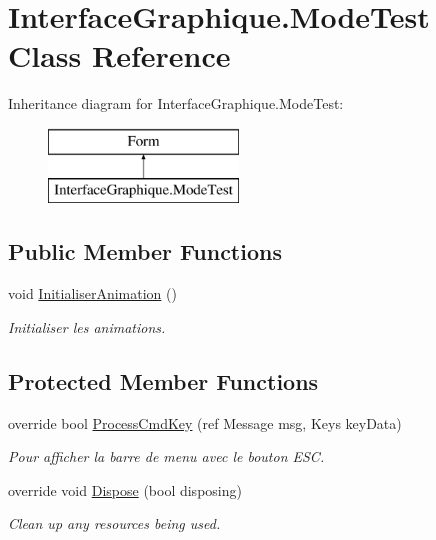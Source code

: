 \hypertarget{class_interface_graphique_1_1_mode_test}{}\section{Interface\+Graphique.\+Mode\+Test Class Reference}
\label{class_interface_graphique_1_1_mode_test}
Inheritance diagram for Interface\+Graphique.\+Mode\+Test\+:\begin{figure}[H]
\begin{center}
\leavevmode
\includegraphics[height=2.000000cm]{class_interface_graphique_1_1_mode_test}
\end{center}
\end{figure}
\subsection*{Public Member Functions}
\begin{DoxyCompactItemize}
\item 
\hypertarget{class_interface_graphique_1_1_mode_test_afb82898571c13159717496bd5ef0f9cd}{}\label{class_interface_graphique_1_1_mode_test_afb82898571c13159717496bd5ef0f9cd} 
void \hyperlink{class_interface_graphique_1_1_mode_test_afb82898571c13159717496bd5ef0f9cd}{Initialiser\+Animation} ()
\begin{DoxyCompactList}\small\item\em Initialiser les animations. \end{DoxyCompactList}\end{DoxyCompactItemize}
\subsection*{Protected Member Functions}
\begin{DoxyCompactItemize}
\item 
\hypertarget{class_interface_graphique_1_1_mode_test_a253fb0ff92405481372471873a088afd}{}\label{class_interface_graphique_1_1_mode_test_a253fb0ff92405481372471873a088afd} 
override bool \hyperlink{class_interface_graphique_1_1_mode_test_a253fb0ff92405481372471873a088afd}{Process\+Cmd\+Key} (ref Message msg, Keys key\+Data)
\begin{DoxyCompactList}\small\item\em Pour afficher la barre de menu avec le bouton E\+SC. \end{DoxyCompactList}\item 
override void \hyperlink{class_interface_graphique_1_1_mode_test_a06f68e45851d96953a8413bd1d85a59c}{Dispose} (bool disposing)
\begin{DoxyCompactList}\small\item\em Clean up any resources being used. \end{DoxyCompactList}\end{DoxyCompactItemize}


